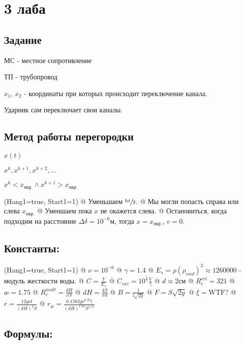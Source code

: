 \documentclass[12pt, a4paper]{article}
\begin{document}
\section{3 лаба}

\subsection{Задание}

МС - местное сопротивление

ТП - трубопровод

$x_1$, $x_2$ - координаты при которых происходит переключение канала.

Ударник сам переключает свои каналы.

\subsection{Метод работы перегородки}

$ x(t) $

$ x^k, x^{k+1}, x^{k+2}, \dots $

$ x^k < x_\text{окр.} \wedge x^{k+1} > x_\text{окр.} $


\noindent\begin{easylist}
\ListProperties(Hang1=true, Start1=1)
@ Уменьшаем $\sfrac{ht}{2}$.
@ Мы могли попасть справа или слева $x_\text{окр.}$
@ Уменшаем пока $x$ не окажется слева.
@ Остановиться, когда подходим на расстояние $\Delta\delta = 10^{-6} \text{м}$, тогда $x = x_{\text{окр.}}$, $v = 0$.
\end{easylist}

\subsection{Константы:}

\noindent\begin{easylist}
\ListProperties(Hang1=true, Start1=1)
@ $ \nu = 10^{-6} $
@ $ \gamma = 1.4 $
@ $ E_s = \rho (\rho_{swd})^2 \approx 1260000 $ - модуль жесткости воды.
@ $ C = \frac{V}{E_s} $
@ $ C_{cav} = 10^{\frac5\gamma}\frac{V}{\gamma} $
@ $ d \approx 2 \text{см} $
@ $ R_e^{crt} = 321 $
@ $ \text{\ae} = 1.75 $
@ $ R_e^{mult} = \frac{dH}{\nu S} $
@ $ dH = \frac{4S}{\pi d} $
@ $ B = \frac{1}{l\sqrt{2g}} $
@ $ F = S\sqrt{2g} $
@ $ \xi = \text{WTF?} $
@ $ r = \frac{12g\nu l}{(dH)^2 S} $
@ $ r_\text{\ae} = \frac{0.1582 g \nu^{0.25} l}{(dH)^{1.35} S^{1.75}} $
\end{easylist}

\subsection{Формулы:}
\end{document}

